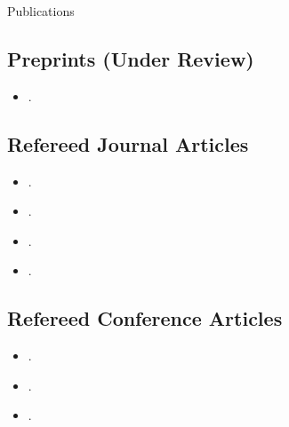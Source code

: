 \begin{rSection}{Publications}



\subsection*{Preprints (Under Review)}
\begin{itemize}
    \setlength\itemsep{0.5em}
    \item {}.
\end{itemize}

\subsection*{Refereed Journal Articles}
\begin{itemize}
    \setlength\itemsep{0.5em}
    \item {}.
    \item {}.
    \item {}.
    \item {}.
\end{itemize}

\subsection*{Refereed Conference Articles}
\begin{itemize}
    \setlength\itemsep{0.5em}
    \item {}.
    \item {}.
    \item {}.
\end{itemize}

\end{rSection}
